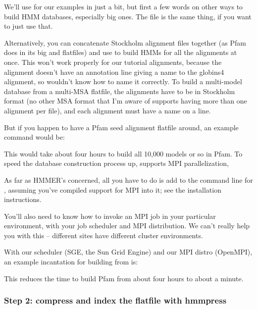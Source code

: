 We'll use  for our examples in just a bit, but first a
few words on other ways to build HMM databases, especially big ones.
The file  is the same thing, if you want to
just use that.

Alternatively, you can concatenate Stockholm alignment files together
(as Pfam does in its big  and 
flatfiles) and use  to build HMMs for all the
alignments at once. This won't work properly for our tutorial
alignments, because the  alignment doesn't have an
 annotation line giving a name to the globins4
alignment, so  wouldn't know how to name it
correctly. To build a multi-model database from a multi-MSA flatfile,
the alignments have to be in Stockholm format (no other MSA format
that I'm aware of supports having more than one alignment per file),
and each alignment must have a name on a  line.

But if you happen to have a Pfam seed alignment flatfile
 around, an example command would be:


This would take about four hours to build all 10,000 models or so in
Pfam.  To speed the database construction process up, 
supports MPI parallelization,

As far as HMMER's concerned, all you have to do is add  to
the command line for , assuming you've compiled support
for MPI into it; see the installation instructions.

You'll also need to know how to invoke an MPI job in your particular
environment, with your job scheduler and MPI distribution. We can't
really help you with this -- different sites have different cluster
environments.

With our scheduler (SGE, the Sun Grid Engine) and our MPI distro
(OpenMPI), an example incantation for building  from
 is:


This reduces the time to build Pfam from about four hours to about a
minute.

\subsubsection{Step 2: compress and index the flatfile with hmmpress}

